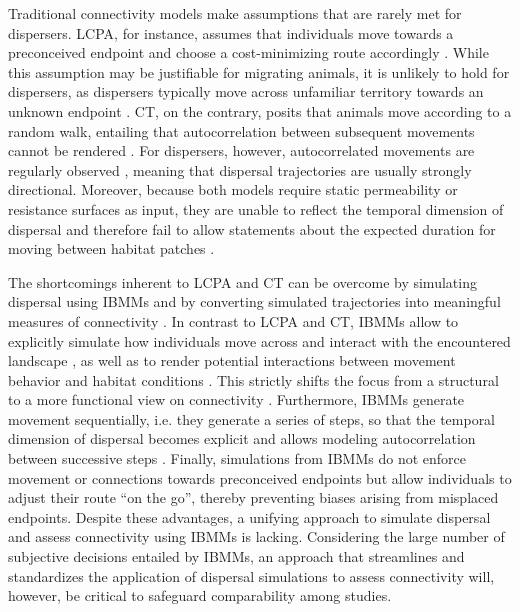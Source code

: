 \documentclass[abstract=on,10pt,a4paper,bibliography=totocnumbered]{article}
\begin{document}
Traditional connectivity models make assumptions that are rarely met for
dispersers. LCPA, for instance, assumes that individuals move towards a
preconceived endpoint and choose a cost-minimizing route accordingly
\citep{Sawyer.2011, Abrahms.2017}. While this assumption may be justifiable for
migrating animals, it is unlikely to hold for dispersers, as dispersers
typically move across unfamiliar territory towards an unknown endpoint
\citep{Koen.2014, Cozzi.2020}. CT, on the contrary, posits that animals move
according to a random walk, entailing that autocorrelation between subsequent
movements cannot be rendered \citep{Diniz.2019}. For dispersers, however,
autocorrelated movements are regularly observed \citep{Cozzi.2020,
Hofmann.2021}, meaning that dispersal trajectories are usually strongly
directional. Moreover, because both models require static permeability or
resistance surfaces as input, they are unable to reflect the temporal dimension
of dispersal and therefore fail to allow statements about the expected duration
for moving between habitat patches \citep{Martensen.2017, Diniz.2019}.

The shortcomings inherent to LCPA and CT can be overcome by simulating dispersal
using IBMMs and by converting simulated trajectories into meaningful measures of
connectivity \citep{Diniz.2019}. In contrast to LCPA and CT, IBMMs allow to
explicitly simulate how individuals move across and interact with the
encountered landscape \citep{Kanagaraj.2013, Clark.2015, Allen.2016,
Hauenstein.2019, Zeller.2020}, as well as to render potential interactions
between movement behavior and habitat conditions \citep{Avgar.2016}. This
strictly shifts the focus from a structural to a more functional view on
connectivity \citep{Tischendorf.2000}. Furthermore, IBMMs generate movement
sequentially, i.e. they generate a series of steps, so that the temporal
dimension of dispersal becomes explicit and allows modeling autocorrelation
between successive steps \citep{Diniz.2019}. Finally, simulations from IBMMs do
not enforce movement or connections towards preconceived endpoints but allow
individuals to adjust their route  ``on the go'', thereby preventing biases
arising from misplaced endpoints. Despite these advantages, a unifying approach
to simulate dispersal and assess connectivity using IBMMs is lacking.
Considering the large number of subjective decisions entailed by IBMMs, an
approach that streamlines and standardizes the application of dispersal
simulations to assess connectivity will, however, be critical to safeguard
comparability among studies.
\end{document}
